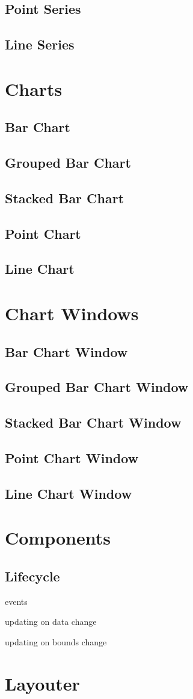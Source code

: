 \subsection{Point Series}
\subsection{Line Series}

\section{Charts}

\subsection{Bar Chart}
\subsection{Grouped Bar Chart}
\subsection{Stacked Bar Chart}
\subsection{Point Chart}
\subsection{Line Chart}

\section{Chart Windows}

\subsection{Bar Chart Window}
\subsection{Grouped Bar Chart Window}
\subsection{Stacked Bar Chart Window}
\subsection{Point Chart Window}
\subsection{Line Chart Window}

\section{Components}



\subsection{Lifecycle}

events

updating on data change

updating on bounds change

\section{Layouter}